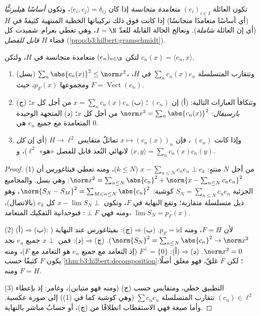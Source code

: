 \begin{definition}\label{def:b3:hilbert:onb}
تكون العائلة $(e_i)_{i\in I}$ \emph{متعامدة متجانسة} إذا كان
$\langle
e_i, e_j\rangle = \delta_{ij}$، وتكون \emph{أساسًا هيلبرتيًّا} (أي
أساسًا متعامدًا متجانسًا) إذا كانت فوق ذلك تركيباتها الخطية
المنتهية كثيفةً في $H$ (أي إن العائلة \emph{شاملة}). ونعالج
الحالة القابلة للعدّ $I = \N$، وهي تغطي بغرام--شميدت كل فضاء $H$
\emph{قابل للفصل} (\cref{prop:b3:hilbert:gramschmidt}).
\end{definition}

\begin{theorem}\label{thm:b3:hilbert:parseval}
لتكن $(e_n)_{n\in\N}$ متعامدة متجانسة في $H$، ولتكن $c_n(x) =
\langle e_n, x\rangle$.
\begin{enumerate}
  \item (بسل) $\sum_n\abs{c_n(x)}^2 \leq \norm x^2$، وتتقارب المتسلسلة $\sum_nc_n(x)e_n$ في $H$،
        ومجموعها $p_F(x)$، حيث $F = \overline{\operatorname{Vect}}(e_n)$.
  \item وتتكافأ العبارات التالية: (أ) إن $(e_n)$ ؛ (ب) $x = \sum_nc_n(x)e_n$ من أجل كل $x$؛ (ج)
        \emph{بارسيفال}: $\norm x^2
        = \sum_n\abs{c_n(x)}^2$ من أجل
        كل $x$؛ (د) المتجهة الوحيدة المتعامدة مع جميع $e_n$
        هي $0$.
  \item وإذا كانت $(e_n)$ ، فإن $x \mapsto (c_n(x))_n$ تماثلٌ
        متقايس $H \to \ell^2$ (أي إن \emph{كل} 
        لانهائي البُعد قابل للفصل «هو» $\ell^2$)، و $\langle x, y\rangle =
        \sum_n\overline{c_n(x)}c_n(y)$.
\end{enumerate}
\end{theorem}

\begin{proof}
(1) من أجل $N$ منتهٍ: $x - \sum_{n\leq N}c_ne_n \perp e_k$ ($k
\leq N$)، ومنه تعطي فيثاغورس أن
$\norm x^2 = \sum_{n\leq
N}\abs{c_n}^2 + \norm{x - \sum_{n\leq N}c_ne_n}^2$: وهي بسل. والمجاميع الجزئية $S_N = \sum_{n\leq N}c_ne_n$ كوشية: $\norm{S_N - S_M}^2 = \sum_{M<n\leq N}\abs{c_n}^2$، وهو
ذيل متسلسلة متقاربة؛ وتقع النهاية في $F$، وتكون $x - \lim S_N
\perp$ كل $e_k$
(بالاتصال)، ومنه فهي $\perp F$: فبوحدانية التفكيك المتعامد،
$\lim S_N = p_F(x)$.

(2) (أ)$\Rightarrow$(ب): لأن $F = H$، ومنه $p_F = \mathrm{id}$.
(ب)$\Rightarrow$(ج): بفيثاغورس عند النهاية ($\norm{S_N}^2
= \sum_{n \leq N}\abs{c_n}^2 \to \norm x^2$).
(ج)$\Rightarrow$(د): فمن $x \perp$ جميع $e_n$ نجد $\norm x^2 =
0$.
(د)$\Rightarrow$(أ): $F^\perp = \{0\}$ (إذ التعامد مع جميع $e_n$ هو
التعامد مع $F$)، ومنه يكون $F$ كثيفًا حسب \cref{thm:b3:hilbert:decomposition}؛ لكن $F$
غلقٌ، فهو مغلق أصلًا: ومنه $F = H$.

(3) التطبيق خطي، ومتقايس حسب (ج) (ومنه فهو متباين)، وغامر:
إذ بإعطاء $(c_n) \in \ell^2$ تتقارب المتسلسلة $\sum
c_ne_n$ (وهي كوشية كما في (1))
إلى صورة عكسية. وأما صيغة  فهي الاستقطاب انطلاقًا
من (ج)، أو حسابٌ مباشر بالنهاية.
\end{proof}


